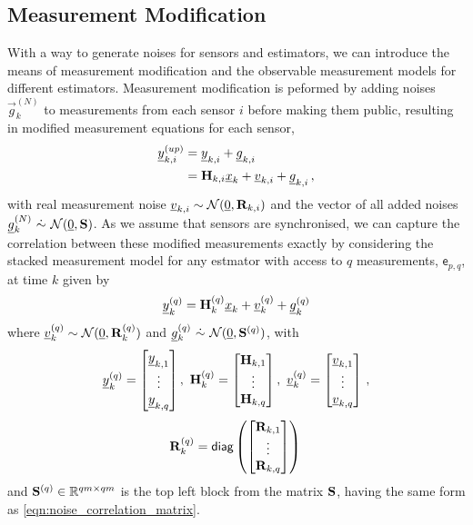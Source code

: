 \documentclass[conference]{IEEEtran}
\begin{document}
\subsection{Measurement Modification}
With a way to generate noises for sensors and estimators, we can introduce the means of measurement modification and the observable measurement models for different estimators. Measurement modification is peformed by adding noises $\vec{g}_k^{(N)}$ to measurements from each sensor $i$ before making them public, resulting in modified measurement equations for each sensor,
\begin{equation}
\begin{split}
  {\underline{y}}_{k,i}^{(up)} &= {\underline{y}}_{k,i} + {\underline{g}}_{k,i}\\
  &= {{\mathbf{H}}}_{k,i}{\underline{x}}_k + {\underline{v}}_{k,i} + {\underline{g}}_{k,i}\,,
\end{split}
\end{equation}
with real measurement noise ${\underline{v}}_{k,i}\sim\mathcal{N}({\underline{0}},{{\mathbf{R}}}_{k,i})$ and the vector of all added noises ${\underline{g}}_k^{(N)}\ \dot{\sim}\ \mathcal{N}({\underline{0}}, {{\mathbf{S}}})$. As we assume that sensors are synchronised, we can capture the correlation between these modified measurements exactly by considering the stacked measurement model for any estmator with access to $q$ measurements, $\mathsf{e}_{p,q}$, at time $k$ given by
\begin{equation}\label{eqn:measurement_equation}
  \vec{y}_k^{(q)} = \mat{H}_k^{(q)}\vec{x}_k + \vec{v}_k^{(q)} + \vec{g}_k^{(q)}
\end{equation}
where ${\underline{v}}_k^{(q)}\sim\mathcal{N}({\underline{0}},{{\mathbf{R}}}_k^{(q)})$ and $\vec{g}_k^{(q)}\ \dot{\sim}\ \mathcal{N}(\vec{0},\mat{S}^{(q)})$, with
\begin{equation*}
  \vec{y}_k^{(q)}=
  \begin{bmatrix}
    \vec{y}_{k,1}\\
    \vdots\\
    \vec{y}_{k,q}
  \end{bmatrix},\ 
  \mat{H}_k^{(q)}=
  \begin{bmatrix}
    \mat{H}_{k,1}\\
    \vdots\\
    \mat{H}_{k,q}\\
  \end{bmatrix}, \
  \vec{v}_k^{(q)}=
  \begin{bmatrix}
    \vec{v}_{k,1}\\
    \vdots\\
    \vec{v}_{k,q}
  \end{bmatrix}\,,
\end{equation*}
\begin{equation*}
  {\ensuremath{{\mathbf{R}}}}_k^{(q)}=\mathsf{diag}\left(
    \begin{bmatrix}
      {\ensuremath{{\mathbf{R}}}}_{k,1}\\
      \vdots\\
      {{\mathbf{R}}}_{k,q}
    \end{bmatrix}\right)\,
\end{equation*}
and ${{\mathbf{S}}}^{(q)} \in \mathbb{R}^{qm\times qm}$ is the top left block from the matrix ${{\mathbf{S}}}$, having the same form as \eqref{eqn:noise_correlation_matrix}.
\end{document}
